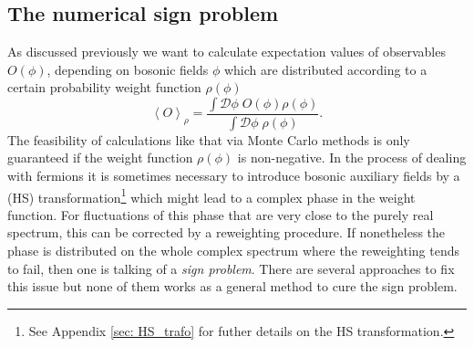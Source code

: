 \subsection{The numerical sign problem}\label{sec: sign_prob}
As discussed previously we want to calculate expectation values of observables $O(\phi)$, depending on bosonic fields $\phi$ which are distributed according to a certain probability weight function $\rho(\phi)$
%
%
\begin{equation}
\left\langle O \right\rangle_{\rho} = \frac{\int \mathcal{D}\phi\; O(\phi)\rho(\phi)}{\int \mathcal{D}\phi\; \rho(\phi)}.
\end{equation}
%
%
The feasibility of calculations like that via Monte Carlo methods is only guaranteed if the weight function $\rho(\phi)$ is non-negative. In the process of dealing with fermions it is sometimes necessary to introduce bosonic auxiliary fields by a  (HS)  transformation\footnote{See Appendix \ref{sec: HS_trafo} for futher details on the HS transformation.} which might lead to a complex phase in the weight function. For fluctuations of this phase that are very close to the purely real spectrum, this can be corrected by a reweighting procedure. If nonetheless the phase is distributed on the whole complex spectrum where the reweighting tends to fail, then one is talking of a \textit{sign problem}. There are several approaches to fix this issue but none of them works as a general method to cure the sign problem.
